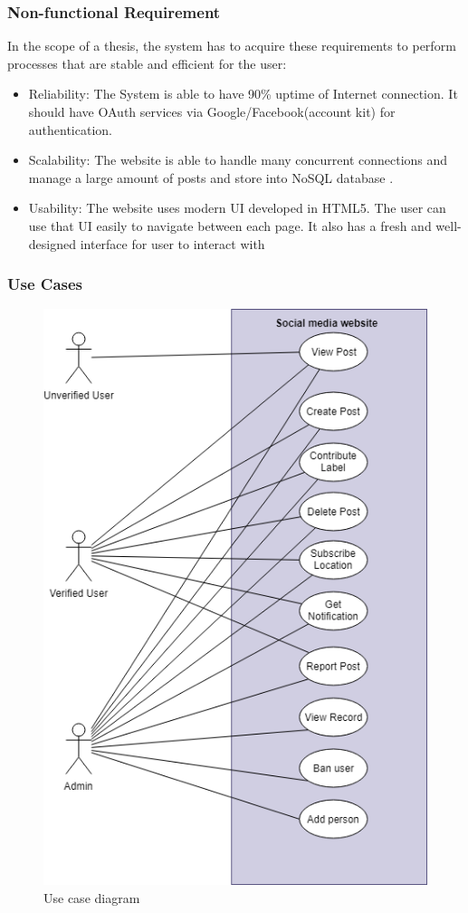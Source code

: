 \subsubsection{Non-functional Requirement}
In the scope of a thesis, the system has to acquire these requirements to perform processes that are stable and efficient for the user:
\begin{itemize}
	\item Reliability: The System is able to have 90\% uptime of Internet connection. It should have OAuth services via Google/Facebook(account kit) for authentication.
	\item Scalability: The website is able to handle many concurrent connections and manage a large amount of posts and store into NoSQL database .
	\item Usability: The website uses modern UI developed in HTML5. The user can use that UI easily to navigate between each page. It also has a fresh and well-designed interface for user to interact with
\end{itemize} 
\subsubsection{Use Cases}
\begin{center}
	\begin{figure}[H]
		\centering
		\includegraphics[width=0.75\columnwidth]{images/chap4/usecase.png}
		\caption{Use case diagram}
		\label{chap4:user_case_diagram}
	\end{figure}
\end{center}

